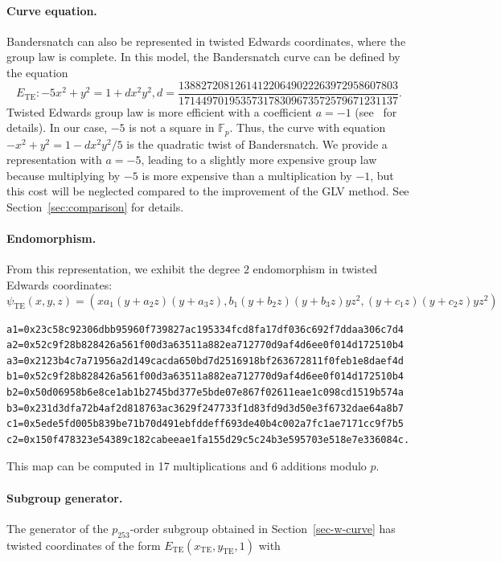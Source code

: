\documentclass{article}
\newcommand{\Fp}{\ensuremath{\mathbb F_p}}
\theoremstyle{definition}
\begin{document}
\paragraph{Curve equation.}
Bandersnatch can also be represented in twisted Edwards coordinates,
where the group law is complete.
In this model, the Bandersnatch curve can be defined by the equation
$$E_\text{TE}:-5x^2+y^2 = 1 +
dx^2y^2, d=\frac{138827208126141220649022263972958607803}{171449701953573178309673572579671231137}.$$
Twisted Edwards group law is more efficient with a coefficient
$a = -1$ (see~\cite{AC:HWCD08} for details).
In our case, $-5$ is not a square in $\Fp$. Thus, the curve with
equation $-x^2+y^2 = 1 -dx^2y^2/5$ is the quadratic twist of
Bandersnatch. We provide a representation with $a=-5$, leading to a
slightly more expensive group law because multiplying by $-5$ is more
expensive than a multiplication by $-1$, but this cost will be
neglected compared to the improvement of the GLV method. See
Section~\ref{sec:comparison} for details.

\paragraph{Endomorphism.}
From this representation, we exhibit the degree $2$ endomorphism in
twisted Edwards coordinates:
$$\psi_\text{TE}(x,y,z) = (xa_1(y+a_2z)(y+a_3z), b_1(y+b_2z)(y+b_3z)yz^2,
(y+c_1z)(y+c_2z)yz^2)$$
\begin{verbatim}
a1=0x23c58c92306dbb95960f739827ac195334fcd8fa17df036c692f7ddaa306c7d4
a2=0x52c9f28b828426a561f00d3a63511a882ea712770d9af4d6ee0f014d172510b4
a3=0x2123b4c7a71956a2d149cacda650bd7d2516918bf263672811f0feb1e8daef4d
b1=0x52c9f28b828426a561f00d3a63511a882ea712770d9af4d6ee0f014d172510b4
b2=0x50d06958b6e8ce1ab1b2745bd377e5bde07e867f02611eae1c098cd1519b574a
b3=0x231d3dfa72b4af2d818763ac3629f247733f1d83fd9d3d50e3f6732dae64a8b7
c1=0x5ede5fd005b839be71b70d491ebfddeff693de40b4c002a7fc1ae7171cc9f7b5
c2=0x150f478323e54389c182cabeeae1fa155d29c5c24b3e595703e518e7e336084c.
\end{verbatim}
This map can be computed in 17 multiplications and 6 additions modulo $p$.

\paragraph{Subgroup generator.}
The generator of the $p_{253}$-order subgroup obtained in
Section~\ref{sec-w-curve} has twisted coordinates
of the form $E_\text{TE}(x_\text{TE},y_\text{TE},1)$ with

\end{document}
